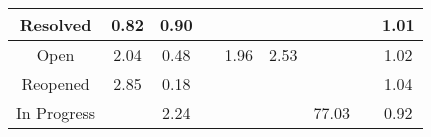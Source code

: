 \begin{tabular}{|c||c|c|c|c|c|c|c|c|}
\hline
Resolved & \cellcolor[rgb]{0.8772125344802504,0.6848059965398517,0.38939836551490037} 0.82 & \cellcolor[rgb]{0.8921998674244878,0.755746039142575,0.4033865429295218} 0.90 &  &  &  &  &  & \cellcolor[rgb]{0.9099686767524258,0.8399851626722017,0.42} 1.01 \\ 
\hline
Open & \cellcolor[rgb]{0.9047997456635132,0.8375367216300851,0.42} 2.04 & \cellcolor[rgb]{0.8141116782467832,0.38612861036810686,0.33050423303033094} 0.48 &  & \cellcolor[rgb]{0.9052189449829954,0.8377352897287873,0.42} 1.96 & \cellcolor[rgb]{0.9023497728447337,0.8363762081896107,0.42} 2.53 &  &  & \cellcolor[rgb]{0.9098974572462766,0.8399514271166573,0.42} 1.02 \\ 
\hline
Reopened & \cellcolor[rgb]{0.9007454571145083,0.8356162691595038,0.42} 2.85 & \cellcolor[rgb]{0.76,0.13,0.28} 0.18 &  &  &  &  &  & \cellcolor[rgb]{0.90981879460685,0.8399141658664026,0.42} 1.04 \\ 
\hline
In Progress &  & \cellcolor[rgb]{0.9038014062227864,0.8370638240002672,0.42} 2.24 &  &  &  & \cellcolor[rgb]{0.53,0.66,0.42} 77.03 &  & \cellcolor[rgb]{0.8950573406980441,0.7692714126374086,0.40605351798484113} 0.92 \\ 
\hline
\end{tabular}